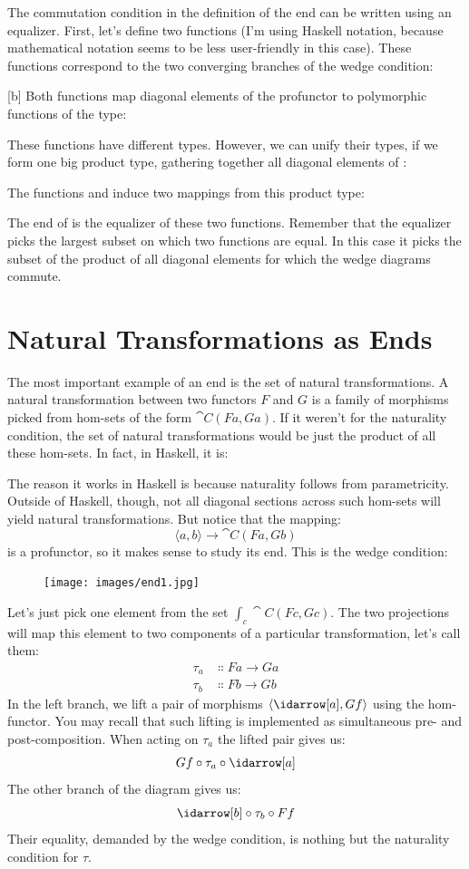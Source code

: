 The commutation condition in the definition of the end can be written
using an equalizer. First, let's define two functions (I'm using Haskell
notation, because mathematical notation seems to be less user-friendly
in this case). These functions correspond to the two converging branches
of the wedge condition:

[b]
Both functions map diagonal elements of the profunctor  to
polymorphic functions of the type:

These functions have different types. However, we can unify their types,
if we form one big product type, gathering together all diagonal
elements of :

The functions  and  induce two mappings from
this product type:

The end of  is the equalizer of these two functions. Remember
that the equalizer picks the largest subset on which two functions are
equal. In this case it picks the subset of the product of all diagonal
elements for which the wedge diagrams commute.

\section{Natural Transformations as Ends}

The most important example of an end is the set of natural
transformations. A natural transformation between two functors
$F$ and $G$ is a family of morphisms picked from hom-sets
of the form $\cat{C}(F a, G a)$. If it weren't for the naturality
condition, the set of natural transformations would be just the product
of all these hom-sets. In fact, in Haskell, it is:

The reason it works in Haskell is because naturality follows from
parametricity. Outside of Haskell, though, not all diagonal sections
across such hom-sets will yield natural transformations. But notice that
the mapping:
\[\langle a, b \rangle \to \cat{C}(F a, G b)\]
is a profunctor, so it makes sense to study its end. This is the wedge
condition:

\begin{figure}[H]
  \centering
  \texttt{[image: images/end1.jpg]}
\end{figure}

\noindent
Let's just pick one element from the set $\int_c \cat{C}(F c, G c)$.
The two projections will map this element to two components of a
particular transformation, let's call them:
\begin{align*}
  \tau_a & \Colon F a \to G a \\
  \tau_b & \Colon F b \to G b
\end{align*}
In the left branch, we lift a pair of morphisms
$\langle \idarrow[a], G f \rangle$ using the hom-functor. You
may recall that such lifting is implemented as simultaneous pre- and
post-composition. When acting on $\tau_a$ the lifted pair gives us:
\[G f \circ \tau_a \circ \idarrow[a]\]
The other branch of the diagram gives us:
\[\idarrow[b] \circ \tau_b \circ F f\]
Their equality, demanded by the wedge condition, is nothing but the
naturality condition for $\tau$.

